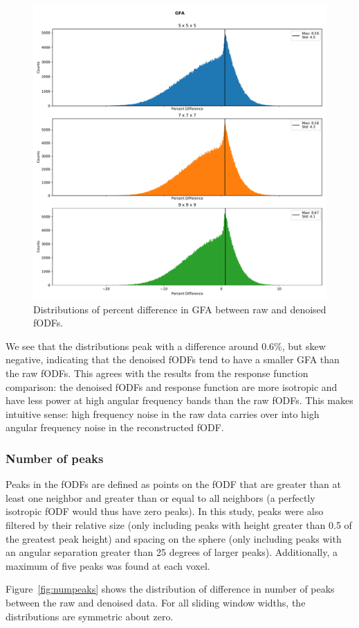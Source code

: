 \documentclass{article}
\begin{document}
\begin{figure}[H]
  \centering
  \includegraphics[width=0.6\linewidth]{../figs/gfa}
  \captionsetup{width=0.6\linewidth}
  \caption{Distributions of percent difference in GFA between raw and denoised fODFs.}
  \label{fig:gfa}
\end{figure}

We see that the distributions peak with a difference around 0.6\%, but skew
negative, indicating that the denoised fODFs tend to have a smaller GFA than the
raw fODFs. This agrees with the results from the response function comparison:
the denoised fODFs and response function are more isotropic and have less power
at high angular frequency bands than the raw fODFs. This makes intuitive sense:
high frequency noise in the raw data carries over into high angular frequency
noise in the reconstructed fODF.

\subsubsection{Number of peaks}
Peaks in the fODFs are defined as points on the fODF that are greater than at
least one neighbor and greater than or equal to all neighbors (a perfectly
isotropic fODF would thus have zero peaks). In this study, peaks were also
filtered by their relative size (only including peaks with height greater than
0.5 of the greatest peak height) and spacing on the sphere (only including peaks
with an angular separation greater than 25 degrees of larger peaks). Additionally,
a maximum of five peaks was found at each voxel.

Figure~\ref{fig:numpeaks} shows the distribution of difference in number
of peaks between the raw and denoised data. For all sliding window widths,
the distributions are symmetric about zero. 
\end{document}
